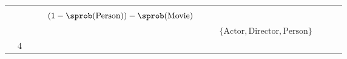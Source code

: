 \begin{table}[]
\begin{tabular}{lllllllllll}
                          &                           &                   & \cellcolor[HTML]{FC8D59}{}   &                                                                                                                 &                           &                                                             &                                                                            &                                                                                          &                                        &                                                                                                                 \\
                          &                           &                   &                                                               & \cellcolor[HTML]{FC8D59}$(1 - \sprob(\text{Person})) - \sprob(\text{Movie})$                                    &                           &                                                             &                                                                            &                                                                                          &                                        &                                                                                                                 \\
                          &                           &                   &                                                               &                                                                                                                 &                           &                                                             & \cellcolor[HTML]{FC8D59}$\{\text{Actor}, \text{Director}, \text{Person}\}$ &                                                                                          &                                        &                                                                                                                 \\
                          & \cellcolor[HTML]{FC8D59}4 &                   &                                                               &                                                                                                                 &                           &                                                             &                                                                            &                                                                                          &                                        &                                                                                                                 \\

\end{tabular}
\end{table}
